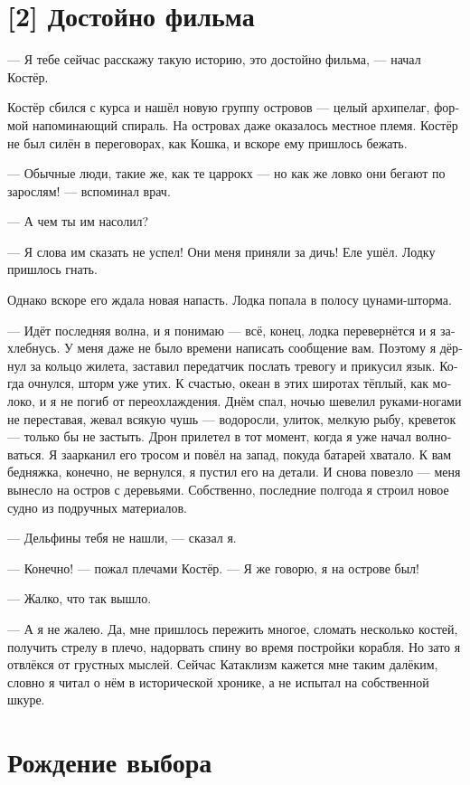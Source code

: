 \documentclass[a4paper,12pt,fleqn]{book}\usepackage{cooltooltips}\usepackage{polyglossia}\setdefaultlanguage[babelshorthands=true]{russian}\setotherlanguage{english}\defaultfontfeatures{Ligatures=TeX,Mapping=tex-text} \usepackage{xcolor}\definecolor{lightgray}{HTML}{bbbbbb}\color{lightgray}\newcommand{\ml}[3]{\textenglish{\textcolor{black}{#3}}}
\begin{document}
{\section{[2] Достойно фильма}

--- Я тебе сейчас расскажу такую историю, это достойно фильма, --- начал Костёр.

Костёр сбился с курса и нашёл новую группу островов --- целый архипелаг, формой напоминающий спираль.
На островах даже оказалось местное племя.
Костёр не был силён в переговорах, как Кошка, и вскоре ему пришлось бежать.

--- Обычные люди, такие же, как те царрокх --- но как же ловко они бегают по зарослям! --- вспоминал врач.

--- А чем ты им насолил?

--- Я слова им сказать не успел!
Они меня приняли за дичь!
Еле ушёл.
Лодку пришлось гнать.

Однако вскоре его ждала новая напасть.
Лодка попала в полосу цунами-шторма.

--- Идёт последняя волна, и я понимаю --- всё, конец, лодка перевернётся и я захлебнусь.
У меня даже не было времени написать сообщение вам.
Поэтому я дёрнул за кольцо жилета, заставил передатчик послать тревогу и прикусил язык.
Когда очнулся, шторм уже утих.
К счастью, океан в этих широтах тёплый, как молоко, и я не погиб от переохлаждения.
Днём спал, ночью шевелил руками-ногами не переставая, жевал всякую чушь --- водоросли, улиток, мелкую рыбу, креветок --- только бы не застыть.
Дрон прилетел в тот момент, когда я уже начал волноваться.
Я заарканил его тросом и повёл на запад, покуда батарей хватало.
К вам бедняжка, конечно, не вернулся, я пустил его на детали.
И снова повезло --- меня вынесло на остров с деревьями.
Собственно, последние полгода я строил новое судно из подручных материалов.

--- Дельфины тебя не нашли, --- сказал я.

--- Конечно! --- пожал плечами Костёр.
--- Я же говорю, я на острове был!

--- Жалко, что так вышло.

--- А я не жалею.
Да, мне пришлось пережить многое, сломать несколько костей, получить стрелу в плечо, надорвать спину во время постройки корабля.
Но зато я отвлёкся от грустных мыслей.
Сейчас Катаклизм кажется мне таким далёким, словно я читал о нём в исторической хронике, а не испытал на собственной шкуре.

\section{Рождение выбора}

}
\end{document}
